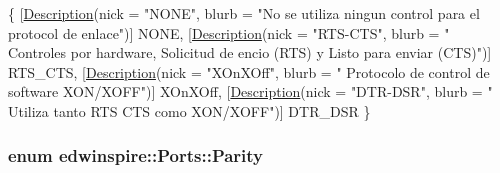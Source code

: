 \begin{DoxyCode}
                                       \{
                        [\hyperlink{namespaceedwinspire_1_1_ports_a3b5ab9c73da132e47d164f322cf54904}{Description}(nick = \textcolor{stringliteral}{"NONE"}, blurb = \textcolor{stringliteral}{"No se
       utiliza ningun control para el protocol de enlace"})]
                        NONE, 
                        [\hyperlink{namespaceedwinspire_1_1_ports_a3b5ab9c73da132e47d164f322cf54904}{Description}(nick = \textcolor{stringliteral}{"RTS-CTS"}, blurb = \textcolor{stringliteral}{"
      Controles por hardware, Solicitud de encio (RTS) y Listo para enviar (CTS)"})]
                        RTS\_CTS, 
                        [\hyperlink{namespaceedwinspire_1_1_ports_a3b5ab9c73da132e47d164f322cf54904}{Description}(nick = \textcolor{stringliteral}{"XOnXOff"}, blurb = \textcolor{stringliteral}{"
      Protocolo de control de software XON/XOFF"})]
                        XOnXOff, 
                        [\hyperlink{namespaceedwinspire_1_1_ports_a3b5ab9c73da132e47d164f322cf54904}{Description}(nick = \textcolor{stringliteral}{"DTR-DSR"}, blurb = \textcolor{stringliteral}{"
      Utiliza tanto RTS CTS como XON/XOFF"})]
                        DTR\_DSR  
                \}
\end{DoxyCode}
\hypertarget{namespaceedwinspire_1_1_ports_ab404a94ffd8da908dfa277d25f4e5012}{
\subsubsection[{Parity}]{\setlength{\rightskip}{0pt plus 5cm}enum {\bf edwinspire\-::\-Ports\-::\-Parity}}}\label{namespaceedwinspire_1_1_ports_ab404a94ffd8da908dfa277d25f4e5012}
